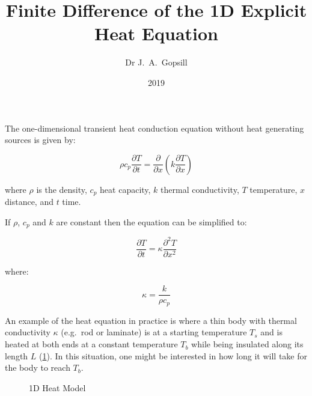 \documentclass[a4page, twocolumn, twoside, 11pt]{article}
\title{Finite Difference of the 1D Explicit Heat Equation}
\author{Dr J.\ A.\ Gopsill}
\date{2019}
\begin{document}
\maketitle


The one-dimensional transient heat conduction equation without heat generating sources is given by:

\begin{equation}
  \rho c_p \frac{\partial T}{\partial t} = \frac{\partial}{\partial x}\left(k\frac{\partial T}{\partial x}\right)
\end{equation}

\noindent where $\rho$ is the density, $c_p$ heat capacity, $k$ thermal conductivity, $T$ temperature, $x$ distance, and $t$ time.

If $\rho$, $c_p$ and $k$ are constant then the equation can be simplified to:

\begin{equation}
  \frac{\partial T}{\partial t} = \kappa\frac{\partial^2 T}{\partial x^2}
  \label{equ:1d-equation}
\end{equation}

\noindent where:

\begin{equation}
  \kappa = \frac{k}{\rho c_p}
\end{equation}

An example of the heat equation in practice is where a thin body with thermal conductivity $\kappa$ (e.g.\ rod or laminate) is at a starting temperature $T_s$ and is heated at both ends at a constant temperature $T_b$ while being insulated along its length $L$ (\cref{fig:model}). In this situation, one might be interested in how long it will take for the body to reach $T_b$.

\begin{figure}
  \centering
  \caption{1D Heat Model}\label{fig:model}
\end{figure}
\end{document}
